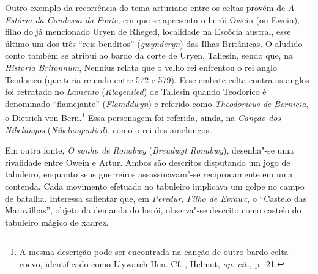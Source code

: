 Outro exemplo da recorrência do tema arturiano entre os celtas provém de
\textit{A Estória da Condessa da Fonte}, em que se apresenta o herói Owein (ou
Ewein), filho do já mencionado Uryen de Rheged, localidade na Escócia austral,
esse último um dos três “reis benditos” (\textit{gwynderyn}) das Ilhas
Britânicas. O aludido conto também se atribui ao bardo da corte de Uryen,
Taliesin, sendo que, na \textit{Historia Britonnum}, Nennius relata que o velho
rei enfrentou o rei anglo Teodorico (que teria reinado entre
572 e 579). Esse embate celta contra os anglos foi retratado no
\textit{Lamento} (\textit{Klagenlied}) de Taliesin quando Teodorico é
denominado “flamejante” (\textit{Flamddwyn}) e referido como
\textit{Theodoricus de Bernicia}, o Dietrich von Bern.\footnote{ A mesma
descrição pode ser encontrada na canção de outro bardo celta coevo,
identificado como Llywarch Hen. Cf. , Helmut, \textit{op. cit.}, p.~21.
} Essa personagem foi referida, ainda, na \textit{Canção dos Nibelungos}
(\textit{Nibelungenlied}), como o rei dos amelungos. 

Em outra fonte, \textit{O sonho de Ronabwy} (\textit{Breudwyt Ronabwy}),
desenha"-se uma rivalidade entre Owein e Artur. Ambos são descritos disputando
um jogo de tabuleiro, enquanto seus guerreiros assassinavam"-se reciprocamente
em uma contenda. Cada movimento efetuado no tabuleiro implicava um golpe no
campo de batalha. Interessa salientar que, em \textit{Peredur, Filho de
Evrawc}, o “Castelo das Maravilhas”, objeto da demanda do herói, observa"-se
descrito como castelo do tabuleiro mágico de xadrez. 

